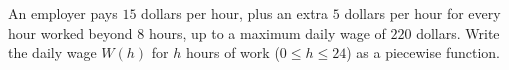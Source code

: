 An employer pays $15$ dollars per hour, plus an extra $5$ dollars per hour for every hour worked beyond $8$ hours, up to a maximum daily wage of $220$ dollars. Write the daily wage $W(h)$ for $h$ hours of work ($0\le h\le24$) as a piecewise function.
